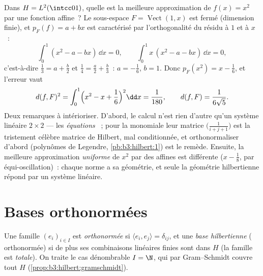 \begin{example}
\label{ex:b3:hilbert:projectionexample}
Dans $H = L^2(\intcc01)$, quelle est la meilleure
approximation de $f(x) = x^2$ par une fonction affine~? Le
sous-espace $F = \operatorname{Vect}(1, x)$ est fermé
(dimension finie), et $p_F(f) = a + bx$ est caractérisé par
l'orthogonalité du résidu à $1$ et à $x$~:
\[
\int_0^1(x^2 - a - bx)\,\dd x = 0,
\qquad
\int_0^1x\,(x^2 - a - bx)\,\dd x = 0,
\]
c'est-à-dire $\frac13 = a + \frac b2$ et $\frac14 = \frac a2
+ \frac b3$~: $a = -\frac16$, $b = 1$. Donc $p_F(x^2) = x -
\frac16$, et l'erreur vaut
\[
d(f, F)^2 = \int_0^1\Bigl(x^2 - x + \frac16\Bigr)^2\dd x =
\frac1{180},
\qquad d(f, F) = \frac1{6\sqrt5} .
\]
Deux remarques à intérioriser. D'abord, le calcul n'est rien
d'autre qu'un système linéaire $2\times2$ --- les
\emph{équations }~; pour la  monomiale leur
matrice $\bigl(\frac1{i+j+1}\bigr)$ est la tristement célèbre
matrice de Hilbert, mal conditionnée, et orthonormaliser
d'abord (polynômes de Legendre, \cref{pb:b3:hilbert:1}) est
le remède. Ensuite, la meilleure approximation
\emph{uniforme} de $x^2$ par des affines est différente ($x
- \frac18$, par équi-oscillation)~: chaque norme a sa
géométrie, et seule la géométrie hilbertienne répond par un
système linéaire.
\end{example}

\section{Bases orthonormées}

\begin{definition}\label{def:b3:hilbert:onb}
Une famille $(e_i)_{i\in I}$ est \emph{orthonormée} si
$\langle e_i, e_j\rangle = \delta_{ij}$, et une \emph{base
hilbertienne} ( orthonormée) si
de plus ses combinaisons linéaires finies sont  dans
$H$ (la famille est \emph{totale}). On traite le cas dénombrable
$I = \N$, qui par Gram--Schmidt couvre tout $H$
\emph{} (\cref{prop:b3:hilbert:gramschmidt}).
\end{definition}

